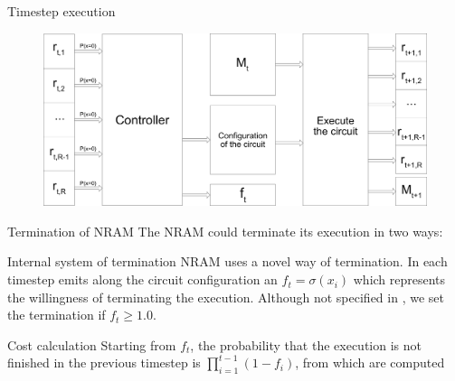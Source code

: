 \documentclass[xcolor={usenames}]{beamer}
\begin{document}
  \begin{frame}{Timestep execution}
  	\begin{figure}
  		\centering
  		\includegraphics[width=\textwidth]{../figures/timestep-nram-execution.png}
  	\end{figure}
  \end{frame}
  \begin{frame}{Termination of NRAM}
  	The NRAM could terminate its execution in two ways:
  	\begin{itemize}
  	\end{itemize}
  \end{frame}
  \begin{frame}{Internal system of termination}
  	NRAM uses a novel way of termination. In each timestep emits along the circuit configuration an $f_t = \sigma(x_i)$ which represents the willingness of terminating the execution. Although not specified in \cite{NRAM:2016}, we set the termination if $f_t \geq 1.0$. 
  \end{frame}
  \begin{frame}{Cost calculation}  
	Starting from $f_t$, the probability that the execution is not finished in the previous timestep is $\prod\limits_{i=1}^{t-1}(1 - f_{i})$, from which are computed
	  \begin{itemize}
	  \end{itemize}
  \end{frame}
\end{document}
